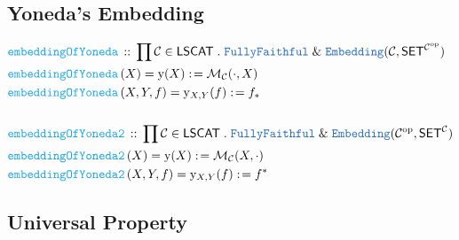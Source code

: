 \documentclass[12pt]{scrartcl}
\newcommand{\TYPE}[1]{\textcolor{NavyBlue}{\mathtt{#1}}}
\newcommand{\FUNC}[1]{\textcolor{Cerulean}{\mathtt{#1}}}
\renewcommand{\.}{\; . \;}
\newcommand{\de}{: \kern 0.1pc =}
\newcommand{\Act}[1]{\left( #1 \right)}
\newcommand{\DeclareFunc}[2]{& \FUNC{#1} \, :: \, #2 \\}
\newcommand{\DefineNamedFunc}[4]{&  \FUNC{#1}\Act{#2} = #3 \de #4 \\}
\newcommand{\Page}[1]{ \begin{align*} #1 \end{align*}   }
\renewcommand{\And}{\; \& \;}
\newcommand{\Mor}{\mathcal{M}}
\newcommand{\op}{\mathrm{op}}
\newcommand{\C}{\mathcal{C}}
\newcommand{\SET}{\mathsf{SET}}
\begin{document}
\subsection{Yoneda's Embedding}
\Page{
	\DeclareFunc{embeddingOfYoneda}{\prod \C \in \mathsf{LSCAT} 
		\. \TYPE{FullyFaithful} \And \TYPE{Embedding}( \C, \SET^{\C^\op})}
	\DefineNamedFunc{embeddingOfYoneda}{X}{\mathrm{y}(X)}{\Mor_\C(\cdot, X)}
	\DefineNamedFunc{embeddingOfYoneda}{X,Y,f}{\mathrm{y}_{X,Y}(f)}{f_*}
	\\
	\DeclareFunc{embeddingOfYoneda2}{\prod \C \in \mathsf{LSCAT} 
		\. \TYPE{FullyFaithful}\And \TYPE{Embedding}( \C^\op, \SET^{\C})}
	\DefineNamedFunc{embeddingOfYoneda2}{X}{\mathrm{y}(X)}{\Mor_\C(X, \cdot)}
	\DefineNamedFunc{embeddingOfYoneda2}{X,Y,f}{\mathrm{y}_{X,Y}(f)}{f^*}
}
\newpage
\subsection{Universal Property}
\end{document}
